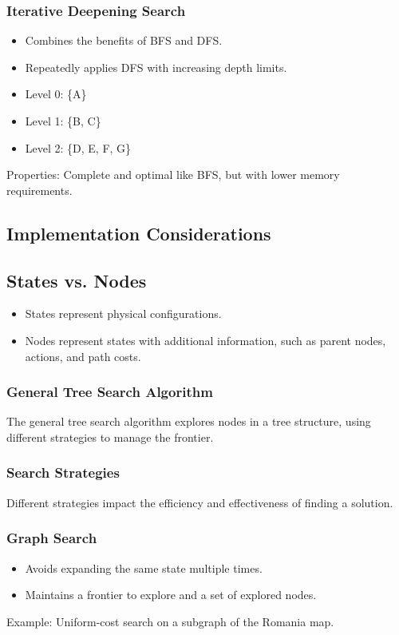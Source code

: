 \documentclass[8pt]{article}
\begin{document}
\subsubsection{Iterative Deepening Search}
\begin{itemize}
    \item Combines the benefits of BFS and DFS.
    \item Repeatedly applies DFS with increasing depth limits.
    \item Level 0: \{A\}
    \item Level 1: \{B, C\}
    \item Level 2: \{D, E, F, G\}
\end{itemize}
Properties: Complete and optimal like BFS, but with lower memory requirements.
\newpage
\subsection*{Implementation Considerations}
\subsection*{States vs. Nodes}
\begin{itemize}
    \item States represent physical configurations.
    \item Nodes represent states with additional information, such as parent nodes, actions, and path costs.
\end{itemize}

\subsubsection*{General Tree Search Algorithm}
The general tree search algorithm explores nodes in a tree structure, using different strategies to manage the frontier.

\subsubsection*{Search Strategies}
Different strategies impact the efficiency and effectiveness of finding a solution.

\subsubsection*{Graph Search}
\begin{itemize}
    \item Avoids expanding the same state multiple times.
    \item Maintains a frontier to explore and a set of explored nodes.
\end{itemize}
Example: Uniform-cost search on a subgraph of the Romania map.
\end{document}
